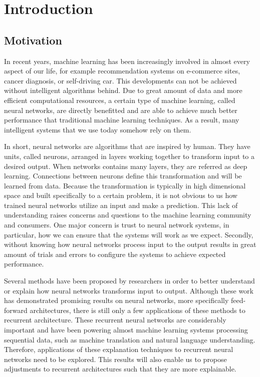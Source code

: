 \chapter{Introduction}
\label{cha:chapter1}
\section{Motivation}
In recent years, machine learning  has been increasingly involved in almost every aspect of our life, for example recommendation systems on e-commerce sites, cancer diagnosis, or self-driving car. This developments can not be achieved without intelligent algorithms behind. Due to great amount of data and more efficient computational resources, a certain type of machine learning, called neural networks, are directly benefitted and are able to achieve much better performance that traditional machine learning techniques. As a result, many intelligent systems that we use today somehow rely on them.


In short, neural networks are algorithms that are inspired by human. They have units, called neurons, arranged in layers working together to transform input to a desired output. When networks contains many layers, they are referred as deep learning. Connections between neurons define this transformation and will be learned from data. Because the transformation is typically in high dimensional space and built specifically to a certain problem, it is not obvious to us how trained neural networks utilize an input and make a prediction.  This lack of understanding  raises concerns and questions to the machine learning community and consumers. One major concern is trust to neural network systems, in particular, how we can ensure that the systems will work as we expect. Secondly, without knowing how neural networks process input to the output results in great amount of trials and errors to configure the systems to achieve expected performance.

Several methods have been proposed by researchers in order to better understand or explain how neural networks transforms input to output. Although these work has demonstrated promising results on neural networks, more specifically feed-forward architectures, there is still only a few applications of these methods to recurrent architecture. These recurrent neural networks are considerably important and have been powering almost machine learning systems processing sequential data, such as machine translation and natural language understanding. Therefore, applications of these explanation techniques to recurrent neural networks need to be explored. This results will also enable us to propose adjustments to recurrent architectures such that they are more explainable.


